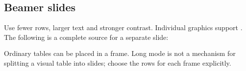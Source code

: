 \subsection{Beamer slides}
Use fewer rows, larger text and stronger contrast. Individual graphics support
. The following is a complete source for a separate slide:
Ordinary tables can be placed in a frame. Long mode is not a mechanism for
splitting a visual table into slides; choose the rows for each frame explicitly.
